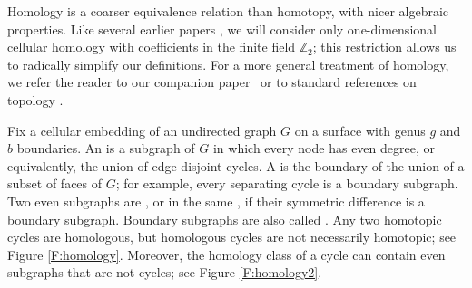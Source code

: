 \documentclass{sig-alternate}
\def\note#1{\EMPH{\color{red} #1}}
\def\Z{\mathbb{Z}}
\def\Real{\mathbb{R}}
\begin{document}

Homology is a coarser equivalence relation than homotopy, with nicer
algebraic properties.  Like several earlier papers \cite{cf-qhc2-07,
cf-qhc-08, dls-chtl-07, dlsc-cgaht-08}, we will consider only
one-dimensional cellular homology with coefficients in the finite
field $\Z_2$; this restriction allows us to radically simplify our
definitions.  For a more general treatment of homology, we refer the
reader to our companion paper~\cite{cen-hfcc-09} or to standard
references on topology \cite{h-at-01, s-ctcgt-93, z-tc-05}.


Fix a cellular embedding of an undirected graph $G$ on a surface with genus $g$ and $b$ boundaries.  An  is a subgraph of $G$ in which every node has even degree, or equivalently, the union of edge-disjoint cycles.  A  is the boundary of the union of a subset of faces of $G$; for example, every separating cycle is a boundary subgraph.
Two even subgraphs are , or in the same , if their symmetric difference is a boundary subgraph.
Boundary subgraphs are also called .  Any two homotopic cycles are homologous, but homologous cycles are not necessarily homotopic; see Figure \ref{F:homology}.  Moreover, the homology class of a cycle can contain even subgraphs that are not cycles; see Figure \ref{F:homology2}.
\end{document}
